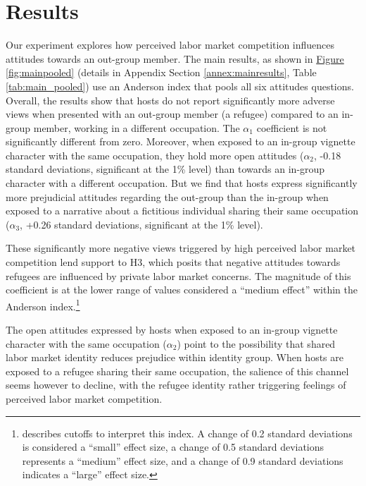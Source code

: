 \documentclass[a4paper,12pt]{article}
\begin{document}
\section{Results}


Our experiment explores how perceived labor market competition influences attitudes towards an out-group member. The main results, as shown in \hyperref[fig:mainpooled]{Figure} \ref{fig:mainpooled} (details in Appendix Section \ref{annex:mainresults}, Table \ref{tab:main_pooled}) use an Anderson index that pools all six attitudes questions. Overall, the results show that hosts do not report significantly more adverse views when presented with an out-group member (a refugee) compared to an in-group member, working in a different  occupation. The $\alpha_1$ coefficient is not significantly different from zero. Moreover, when exposed to an in-group vignette character with the same occupation, they hold more open attitudes ($\alpha_2$, -0.18 standard deviations, significant at the 1\% level) than towards an in-group character with a different occupation. But we find that hosts express significantly more prejudicial attitudes regarding the out-group than the in-group when exposed to a narrative
about a fictitious individual sharing their same occupation ($\alpha_3$, +0.26 standard deviations, significant at the 1\% level). 

These significantly more negative views triggered by high perceived labor market competition lend support to H3, which posits that negative attitudes towards refugees are influenced by private labor market concerns. The magnitude of this coefficient is at the lower range of values considered a ``medium effect'' within the Anderson index.\footnote{\cite{schwab2020constructing} describes cutoffs to interpret this index. A change of 0.2 standard deviations is considered a ``small'' effect size, a change of 0.5 standard deviations represents a ``medium'' effect size, and a change of 0.9 standard deviations indicates a ``large'' effect size.}

The open attitudes expressed by hosts when exposed to an in-group vignette character with the same occupation ($\alpha_2$) point to the possibility that shared labor market identity reduces
prejudice within identity group. When hosts are exposed to a refugee sharing their same occupation, the salience of this channel seems however to decline, with the refugee identity rather triggering feelings of perceived labor market competition.

\vspace{5mm}
\end{document}
